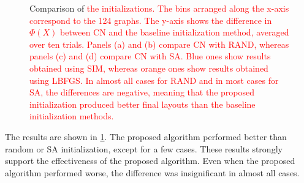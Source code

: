 \documentclass[11pt]{article}
\newcommand{\red}[1]{\textcolor{red}{#1}}
\begin{document}
\begin{figure}[t]
  \caption{
    Comparison of \red{the initializations.
      The bins arranged along the x-axis correspond to the 124 graphs.
      The y-axis shows the difference in $\Phi(X)$ between \textsf{CN} and the baseline initialization method, averaged over ten trials.
      Panels (a) and (b) compare \textsf{CN} with \textsf{RAND}, whereas panels (c) and (d) compare \textsf{CN} with \textsf{SA}.
      Blue ones show results obtained using \textsf{SIM}, whereas orange ones show results obtained using \textsf{LBFGS}.
      In almost all cases for \textsf{RAND} and in most cases for \textsf{SA}, the differences are negative, meaning that the proposed initialization produced better final layouts than the baseline initialization methods.}
  }
  \label{fig:overall-diff}
\end{figure}

The results are shown in \cref{fig:overall-diff}.
The proposed algorithm performed better than random or SA initialization, except for a few cases.
These results strongly support the effectiveness of the proposed algorithm.
Even when the proposed algorithm performed worse, the difference was insignificant in almost all cases.
\end{document}

